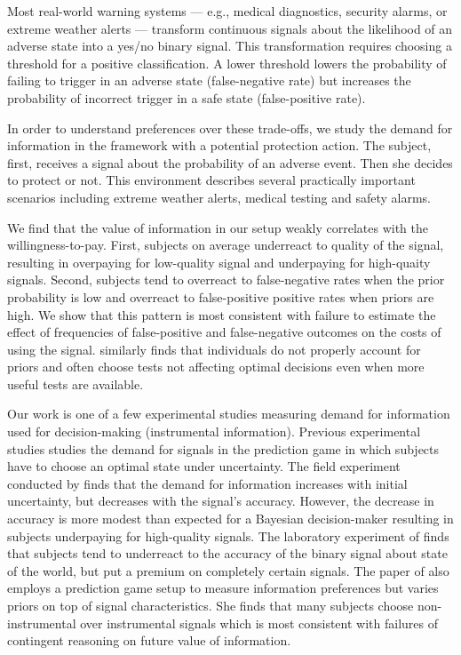 \documentclass[12pt,a4paper]{article}
\begin{document}
Most real-world warning systems --- e.g., medical diagnostics, security alarms, or extreme weather alerts --- transform continuous signals about the likelihood of an adverse state into a yes/no binary signal. This transformation requires choosing a threshold for a positive classification. A lower threshold lowers the probability of failing to trigger in an adverse state (false-negative rate) but increases the probability of incorrect trigger in a safe state (false-positive rate). 

In order to understand preferences over these trade-offs, we study the demand for information in the framework with a potential protection action. The subject, first, receives a signal about the probability of an adverse event. Then she decides to protect or not. This environment describes several practically important scenarios including extreme weather alerts, medical testing and safety alarms. 

We find that the value of information in our setup weakly correlates with the willingness-to-pay. First, subjects on average underreact to quality of the signal, resulting in overpaying for low-quality signal and underpaying for high-quaity signals. Second, subjects tend to overreact to false-negative rates when the prior probability is low and overreact to false-positive positive rates when priors are high. We show that this pattern is most consistent with failure to estimate the effect of frequencies of false-positive and false-negative outcomes on the costs of using the signal. \citep{xu_revealed_2022} similarly finds that individuals do not properly account for priors and often choose tests not affecting optimal decisions even when more useful tests are available.

Our work is one of a few experimental studies measuring demand for information used for decision-making (instrumental information). Previous experimental studies studies the demand for signals in the prediction game in which subjects have to choose an optimal state under uncertainty. The field experiment conducted by \citep{hoffman_how_2016} finds that the demand for information increases with initial uncertainty, but decreases with the signal's accuracy. However, the decrease in accuracy is more modest than expected for a Bayesian decision-maker resulting in subjects underpaying for high-quality signals. The laboratory experiment of \citet{ambuehl_belief_2018} finds that subjects tend to underreact to the accuracy of the binary signal about state of the world, but put a premium on completely certain signals. The paper of \citet{xu_revealed_2022} also employs a prediction game setup to measure information preferences but varies priors on top of signal characteristics. She finds that many subjects choose non-instrumental over instrumental signals which is most consistent with failures of contingent reasoning on future value of information.
\end{document}
